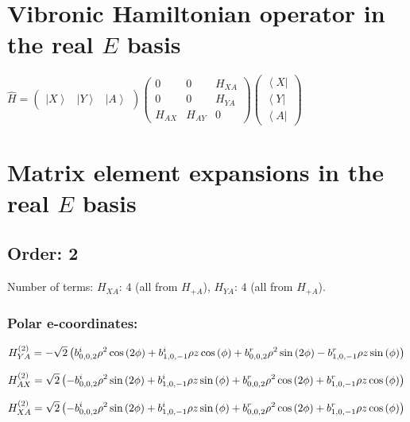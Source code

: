\documentclass[fleqn]{article}
\begin{document}
\section{Vibronic Hamiltonian operator in the real $E$ basis}
$\hat{H}=\left(\begin{matrix}{\left|X\right\rangle } & {\left|Y\right\rangle } & {\left|A\right\rangle }\end{matrix}\right) \left(\begin{matrix}0 & 0 & H_{XA}\\0 & 0 & H_{YA}\\H_{AX} & H_{AY} & 0\end{matrix}\right) \left(\begin{matrix}{\left\langle X\right|}\\{\left\langle Y\right|}\\{\left\langle A\right|}\end{matrix}\right)$
\section{Matrix element expansions in the real $E$ basis}
\subsection{Order: 2}
Number of terms: $H_{XA}$: $4$ (all from $H_{+A}$), $H_{YA}$: $4$ (all from $H_{+A}$).
\subsubsection*{Polar e-coordinates:}

\begin{dmath*}
H_{YA}^{(2)}=-  \sqrt{2} \left( b^{i}_{0,0,2} \rho^{2} \cos{\left (2 \phi \right )} +  b^{i}_{1,0,-1} \rho z \cos{\left (\phi \right )} +  b^{r}_{0,0,2} \rho^{2} \sin{\left (2 \phi \right )} -  b^{r}_{1,0,-1} \rho z \sin{\left (\phi \right )}\right)\\
\end{dmath*}

\begin{dmath*}
H_{AX}^{(2)}=\sqrt{2} \left(- b^{i}_{0,0,2} \rho^{2} \sin{\left (2 \phi \right )} + b^{i}_{1,0,-1} \rho z \sin{\left (\phi \right )} + b^{r}_{0,0,2} \rho^{2} \cos{\left (2 \phi \right )} + b^{r}_{1,0,-1} \rho z \cos{\left (\phi \right )}\right)\\
\end{dmath*}

\begin{dmath*}
H_{XA}^{(2)}=\sqrt{2} \left(- b^{i}_{0,0,2} \rho^{2} \sin{\left (2 \phi \right )} + b^{i}_{1,0,-1} \rho z \sin{\left (\phi \right )} + b^{r}_{0,0,2} \rho^{2} \cos{\left (2 \phi \right )} + b^{r}_{1,0,-1} \rho z \cos{\left (\phi \right )}\right)\\
\end{dmath*}
\end{document}
